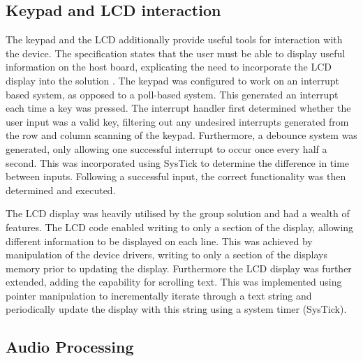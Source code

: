 \subsection*{Keypad and LCD interaction}

The keypad and the LCD additionally provide useful tools for interaction with 
the device. The specification states that the user must be able to display 
useful information on the host board, explicating the need to incorporate the 
LCD display into the solution \cite{specification}. 
The keypad was configured to work on an interrupt based system, as opposed to 
a poll-based system. This generated an interrupt each time a key was pressed. 
The interrupt handler first determined whether the user input was a valid key, 
filtering out any undesired interrupts generated from the row and column 
scanning of the keypad. 
Furthermore, a debounce system was generated, only allowing one successful 
interrupt to occur once every half a second. This was incorporated using SysTick
to determine the difference in time between inputs. 
Following a successful input, the correct functionality was then determined and 
executed. 
\par\bigskip\noindent
The LCD display was heavily utilised by the group solution and had a wealth of 
features. 
The LCD code enabled writing to only a section of the display, allowing different 
information to be displayed on each line. 
This was achieved by manipulation of the device drivers, writing to only a 
section of the displays memory prior to updating the display. 
Furthermore the LCD display was further extended, adding the capability for 
scrolling text. 
This was implemented using pointer manipulation to incrementally iterate through 
a text string and periodically update the display with this string using 
a system timer (SysTick). 

\subsection*{Audio Processing}

